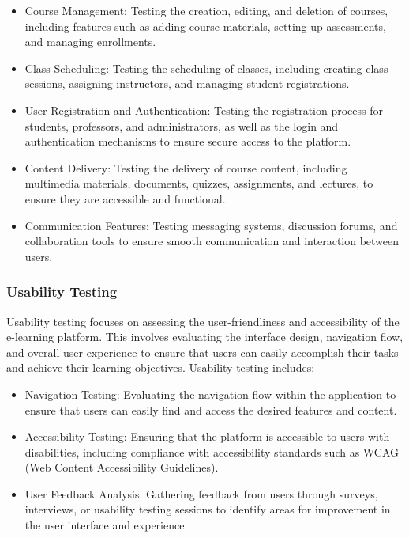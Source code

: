 		\begin{itemize}
			\item Course Management: Testing the creation, editing, and deletion of courses, including features such as adding course materials, setting up assessments, and managing enrollments.
			\item Class Scheduling: Testing the scheduling of classes, including creating class sessions, assigning instructors, and managing student registrations.
			\item User Registration and Authentication: Testing the registration process for students, professors, and administrators, as well as the login and authentication mechanisms to ensure secure access to the platform.
			\item Content Delivery: Testing the delivery of course content, including multimedia materials, documents, quizzes, assignments, and lectures, to ensure they are accessible and functional.
			\item Communication Features: Testing messaging systems, discussion forums, and collaboration tools to ensure smooth communication and interaction between users.
		\end{itemize}
		
		\subsubsection{Usability Testing}
		
		Usability testing focuses on assessing the user-friendliness and accessibility of the e-learning platform. This involves evaluating the interface design, navigation flow, and overall user experience to ensure that users can easily accomplish their tasks and achieve their learning objectives. Usability testing includes:
		
		\begin{itemize}
			\item Navigation Testing: Evaluating the navigation flow within the application to ensure that users can easily find and access the desired features and content.
			\item Accessibility Testing: Ensuring that the platform is accessible to users with disabilities, including compliance with accessibility standards such as WCAG (Web Content Accessibility Guidelines).
			\item User Feedback Analysis: Gathering feedback from users through surveys, interviews, or usability testing sessions to identify areas for improvement in the user interface and experience.
		\end{itemize}
		
